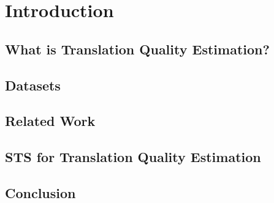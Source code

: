 \chapter{\label{cha:introduction_qe}Introduction}

\section{What is Translation Quality Estimation?}

\section{Datasets}

\section{Related Work}
\cite{kepler-etal-2019-openkiwi}
\section{STS for Translation Quality Estimation}

\section{Conclusion}

